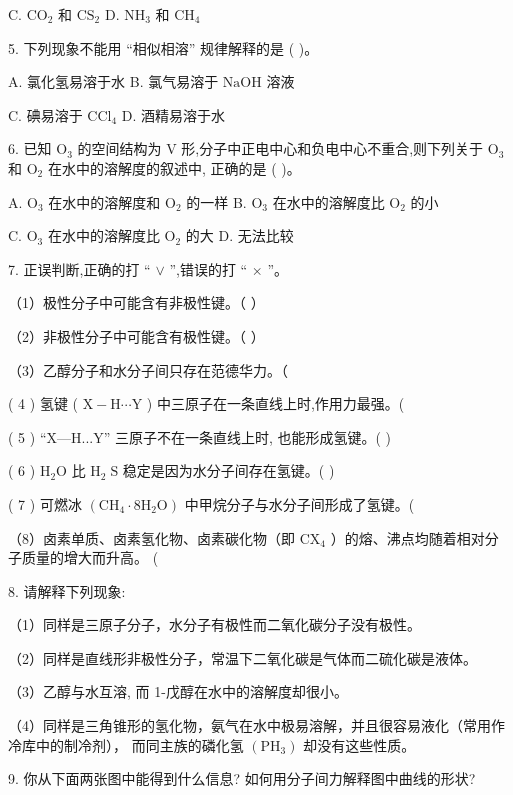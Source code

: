 \documentclass[10pt]{article}
\begin{document}
C. \({\mathrm{{CO}}}_{2}\) 和 \({\mathrm{{CS}}}_{2}\) D. \({\mathrm{{NH}}}_{3}\) 和 \({\mathrm{{CH}}}_{4}\)

5. 下列现象不能用 “相似相溶” 规律解释的是 ( )。

A. 氯化氢易溶于水 B. 氯气易溶于 \(\mathrm{{NaOH}}\) 溶液

C. 碘易溶于 \({\mathrm{{CCl}}}_{4}\) D. 酒精易溶于水

6. 已知 \({\mathrm{O}}_{3}\) 的空间结构为 \(\mathrm{V}\) 形,分子中正电中心和负电中心不重合,则下列关于 \({\mathrm{O}}_{3}\) 和 \({\mathrm{O}}_{2}\) 在水中的溶解度的叙述中, 正确的是 ( )。

A. \({\mathrm{O}}_{3}\) 在水中的溶解度和 \({\mathrm{O}}_{2}\) 的一样 B. \({\mathrm{O}}_{3}\) 在水中的溶解度比 \({\mathrm{O}}_{2}\) 的小

C. \({\mathrm{O}}_{3}\) 在水中的溶解度比 \({\mathrm{O}}_{2}\) 的大 D. 无法比较

7. 正误判断,正确的打 “ \(\vee\) ”,错误的打 “ \(\times\) ”。

（1）极性分子中可能含有非极性键。（ ）

（2）非极性分子中可能含有极性键。（ ）

（3）乙醇分子和水分子间只存在范德华力。（

( 4 ) 氢键 ( \(\mathrm{X} - \mathrm{H}\cdots \mathrm{Y}\) ) 中三原子在一条直线上时,作用力最强。(

( 5 ) “X—H...Y” 三原子不在一条直线上时, 也能形成氢键。( )

( 6 ) \({\mathrm{H}}_{2}\mathrm{O}\) 比 \({\mathrm{H}}_{2}\mathrm{\;S}\) 稳定是因为水分子间存在氢键。( )

( 7 ) 可燃冰 \(\left( {{\mathrm{{CH}}}_{4} \cdot 8{\mathrm{H}}_{2}\mathrm{O}}\right)\) 中甲烷分子与水分子间形成了氢键。(

（8）卤素单质、卤素氢化物、卤素碳化物（即 \({\mathrm{{CX}}}_{4}\) ）的熔、沸点均随着相对分子质量的增大而升高。 (

8. 请解释下列现象:

（1）同样是三原子分子，水分子有极性而二氧化碳分子没有极性。

（2）同样是直线形非极性分子，常温下二氧化碳是气体而二硫化碳是液体。

（3）乙醇与水互溶, 而 1-戊醇在水中的溶解度却很小。

（4）同样是三角锥形的氢化物，氨气在水中极易溶解，并且很容易液化（常用作冷库中的制冷剂）， 而同主族的磷化氢 \(\left( {\mathrm{{PH}}}_{3}\right)\) 却没有这些性质。

9. 你从下面两张图中能得到什么信息? 如何用分子间力解释图中曲线的形状?
\end{document}

